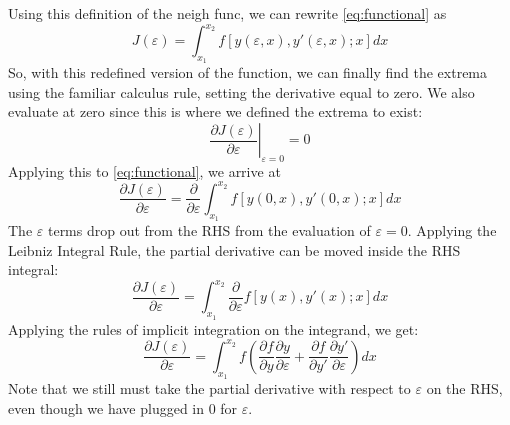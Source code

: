 \documentclass[12pt]{report}
\begin{document}
Using this definition of the \gls{neigh func}, we can rewrite \eqref{eq:functional} as
\begin{equation}\label{eq:neighborhood functional}
    J(\varepsilon)=\int_{x_1}^{x_2}f\left[y(\varepsilon,x),y'(\varepsilon,x);x\right]{dx}
\end{equation}
So, with this redefined version of the function, we can finally find the extrema using the familiar calculus rule, setting the derivative equal to zero. We also evaluate at zero since this is where we defined the extrema to exist:
\begin{equation}
    \left.\frac{\partial J(\varepsilon)}{\partial\varepsilon}\right\vert_{\varepsilon=0}=0
\end{equation}
Applying this to \eqref{eq:functional}, we arrive at
\begin{equation}\label{eq:neighborhood functional diff}
    \frac{\partial J(\varepsilon)}{\partial\varepsilon}= \frac{\partial}{\partial\varepsilon}\int_{x_1}^{x_2}f\left[y(0,x),y'(0,x);x\right]{dx}
\end{equation}
The $\varepsilon$ terms drop out from the RHS from the evaluation of $\varepsilon=0$. Applying the Leibniz Integral Rule, the partial derivative can be moved inside the RHS integral:
\begin{equation}
    \frac{\partial J(\varepsilon)}{\partial\varepsilon}= \int_{x_1}^{x_2}\frac{\partial}{\partial\varepsilon}f\left[y(x),y'(x);x\right]{dx}
\end{equation}
Applying the rules of implicit integration on the integrand, we get:
\begin{equation}\label{eq:diff functional}
    \frac{\partial J(\varepsilon)}{\partial\varepsilon}= \int_{x_1}^{x_2}f\left(\frac{\partial f}{\partial y}\frac{\partial y}{\partial\varepsilon}+\frac{\partial f}{\partial y'}\frac{\partial y'}{\partial\varepsilon}\right){dx}
\end{equation}
Note that we still must take the partial derivative with respect to $\varepsilon$ on the RHS, even though we have plugged in 0 for $\varepsilon$.
\end{document}
